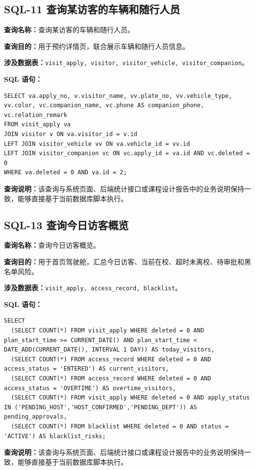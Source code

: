 \subsection{SQL-11 查询某访客的车辆和随行人员}
\textbf{查询名称：}查询某访客的车辆和随行人员。\par
\textbf{查询目的：}用于预约详情页，联合展示车辆和随行人员信息。\par
\textbf{涉及数据表：}\texttt{visit\_apply, visitor, visitor\_vehicle, visitor\_companion}。\par
\textbf{SQL 语句：}
\begin{lstlisting}[style=sqlstyle]
SELECT va.apply_no, v.visitor_name, vv.plate_no, vv.vehicle_type, vv.color, vc.companion_name, vc.phone AS companion_phone, vc.relation_remark
FROM visit_apply va
JOIN visitor v ON va.visitor_id = v.id
LEFT JOIN visitor_vehicle vv ON va.vehicle_id = vv.id
LEFT JOIN visitor_companion vc ON vc.apply_id = va.id AND vc.deleted = 0
WHERE va.deleted = 0 AND va.id = 2;
\end{lstlisting}
\textbf{查询说明：}该查询与系统页面、后端统计接口或课程设计报告中的业务说明保持一致，能够直接基于当前数据库脚本执行。

\subsection{SQL-13 查询今日访客概览}
\textbf{查询名称：}查询今日访客概览。\par
\textbf{查询目的：}用于首页驾驶舱，汇总今日访客、当前在校、超时未离校、待审批和黑名单风险。\par
\textbf{涉及数据表：}\texttt{visit\_apply, access\_record, blacklist}。\par
\textbf{SQL 语句：}
\begin{lstlisting}[style=sqlstyle]
SELECT
  (SELECT COUNT(*) FROM visit_apply WHERE deleted = 0 AND plan_start_time >= CURRENT_DATE() AND plan_start_time < DATE_ADD(CURRENT_DATE(), INTERVAL 1 DAY)) AS today_visitors,
  (SELECT COUNT(*) FROM access_record WHERE deleted = 0 AND access_status = 'ENTERED') AS current_visitors,
  (SELECT COUNT(*) FROM access_record WHERE deleted = 0 AND access_status = 'OVERTIME') AS overtime_visitors,
  (SELECT COUNT(*) FROM visit_apply WHERE deleted = 0 AND apply_status IN ('PENDING_HOST','HOST_CONFIRMED','PENDING_DEPT')) AS pending_approvals,
  (SELECT COUNT(*) FROM blacklist WHERE deleted = 0 AND status = 'ACTIVE') AS blacklist_risks;
\end{lstlisting}
\textbf{查询说明：}该查询与系统页面、后端统计接口或课程设计报告中的业务说明保持一致，能够直接基于当前数据库脚本执行。

